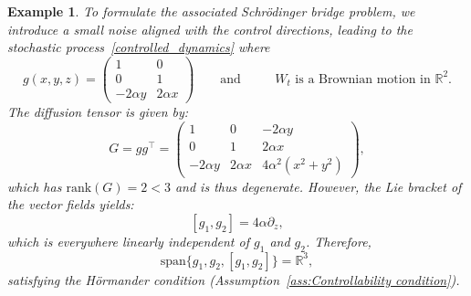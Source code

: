 \documentclass{amsart}
\newtheorem{example}[theorem]{Example}
\numberwithin{equation}{section}
\begin{document}
\begin{example}
{To formulate the associated Schr\"{o}dinger bridge problem, we introduce a small noise aligned with the control directions, leading to the stochastic process~\eqref{controlled_dynamics}
where 
\begin{equation}\label{eq: diff_coefficient}
g(x,y,z) = \begin{pmatrix}1 & 0 \\ 0 & 1 \\ -2\alpha y & 2\alpha x\end{pmatrix}\qquad \text{and}\qquad\text{ $W_t$ is a Brownian motion in $\mathbb{R}^2$}.    
\end{equation}
 The diffusion tensor is given by:
\begin{equation}\label{eq: unified_diffusion_tensor}
G = gg^\top = \begin{pmatrix}
1 & 0 & -2\alpha y \\
0 & 1 & 2\alpha x \\
-2\alpha y & 2\alpha x & 4\alpha^2(x^2+y^2)
\end{pmatrix},
\end{equation}
which has $\mathrm{rank}(G) = 2 < 3$ and is thus degenerate. However, the Lie bracket of the vector fields yields:
\[
[g_1, g_2] = 4\alpha \partial_z,
\]
which is everywhere linearly independent of $g_1$ and $g_2$. Therefore, $$\mathrm{span}\{g_1, g_2, [g_1, g_2]\} = \mathbb{R}^3,$$ satisfying the H\"ormander condition (Assumption~\ref{ass:Controllability condition}).

}
\end{example}
\end{document}
